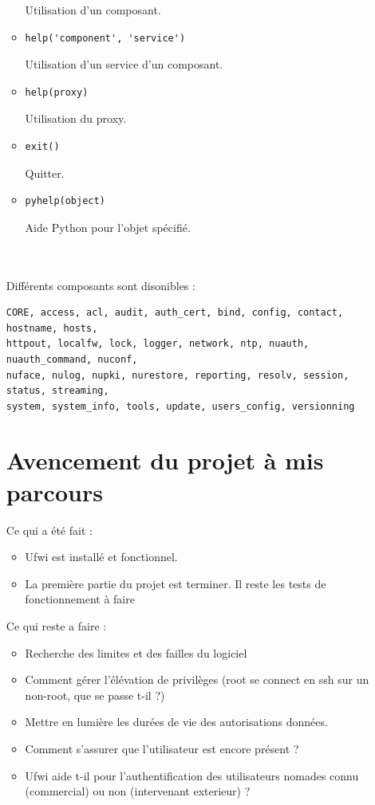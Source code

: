 \documentclass[12pt]{report}
\begin{document}
\begin{itemize}
\begin{itemize}
  Utilisation d'un composant.
  \item \begin{verbatim}help('component', 'service')\end{verbatim}
  Utilisation d'un service d'un composant.
  \item \begin{verbatim}help(proxy)\end{verbatim}
  Utilisation du proxy.
  \item \begin{verbatim}exit()\end{verbatim}
  Quitter.
  \item \begin{verbatim}pyhelp(object)\end{verbatim}
  Aide Python pour l'objet spécifié.
  
\end{itemize}
\\
\\
Différents composants sont disonibles :
\begin{verbatim}
CORE, access, acl, audit, auth_cert, bind, config, contact, hostname, hosts, 
httpout, localfw, lock, logger, network, ntp, nuauth, nuauth_command, nuconf, 
nuface, nulog, nupki, nurestore, reporting, resolv, session, status, streaming, 
system, system_info, tools, update, users_config, versionning
\end{verbatim}


\chapter{Avencement du projet à mis parcours}
Ce qui a été fait :
\begin{itemize}
  \item Ufwi est installé et fonctionnel.
  \item La première partie du projet est terminer. Il reste les tests de fonctionnement à faire
\end{itemize}


Ce qui reste a faire :
\begin{itemize}
  \item Recherche des limites et des failles du logiciel
  \item Comment gérer l'élévation de privilèges (root se connect en ssh sur un non-root, que se passe t-il ?)
  \item Mettre en lumière les durées de vie des autorisations données.
  \item Comment s'assurer que l'utilisateur est encore présent ?
  \item Ufwi aide t-il pour l'authentification des utilisateurs nomades connu (commercial) ou non (intervenant exterieur) ?
\end{itemize}
  


\end{itemize}
\end{document}
